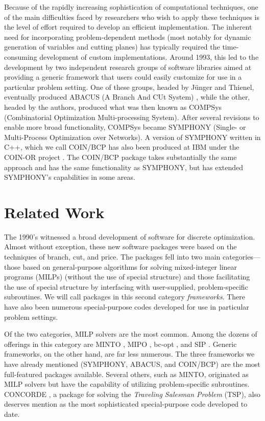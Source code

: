 Because of the rapidly increasing sophistication of computational
techniques, one of the main difficulties faced by researchers who wish
to apply these techniques is the level of effort required to develop
an efficient implementation. The inherent need for incorporating
problem-dependent methods (most notably for dynamic generation of
variables and cutting planes) has typically required the
time-consuming development of custom implementations. Around 1993,
this led to the development by two independent research groups of
software libraries aimed at providing a generic framework that users
could easily customize for use in a particular problem setting. One of
these groups, headed by J\"unger and Thienel, eventually produced
ABACUS (A Branch And CUt System) \cite{abacus1}, while the other,
headed by the authors, produced what was then known as COMPSys
(Combinatorial Optimization Multi-processing System). After several
revisions to enable more broad functionality, COMPSys became SYMPHONY
(Single- or Multi-Process Optimization over Networks). 
A version of SYMPHONY written in C++, which we call
COIN/BCP has also been produced at IBM under the COIN-OR project
\cite{coin-or}. The COIN/BCP package takes substantially the same
approach and has the same functionality as SYMPHONY, but has extended
SYMPHONY's capabilities in some areas.

\section{Related Work}
\label{related}

The 1990's witnessed a broad development of software for discrete
optimization. Almost without exception, these new software packages
were based on the techniques of branch, cut, and price. The packages
fell into two main categories---those based on general-purpose
algorithms for solving mixed-integer linear programs (MILPs)
(without the use of special structure)
and those facilitating the use of special structure by interfacing
with user-supplied, problem-specific subroutines. We will call
packages in this second category {\em frameworks}. There have also
been numerous special-purpose codes developed for use in particular
problem settings.

Of the two categories, MILP solvers are the most common. Among the
dozens of offerings in this category are MINTO \cite{MINTO}, MIPO
\cite{MIPO}, bc-opt \cite{bc-opt}, and SIP \cite{SIP}. Generic
frameworks, on the other hand, are far less numerous. The three
frameworks we have already mentioned (SYMPHONY, ABACUS, and COIN/BCP)
are the most full-featured packages available. Several others, such as
MINTO, originated as MILP solvers but have the capability of utilizing
problem-specific subroutines. CONCORDE \cite{concorde, concorde2}, a
package for solving the {\em Traveling Salesman Problem} (TSP), also
deserves mention as the most sophisticated special-purpose code
developed to date.

